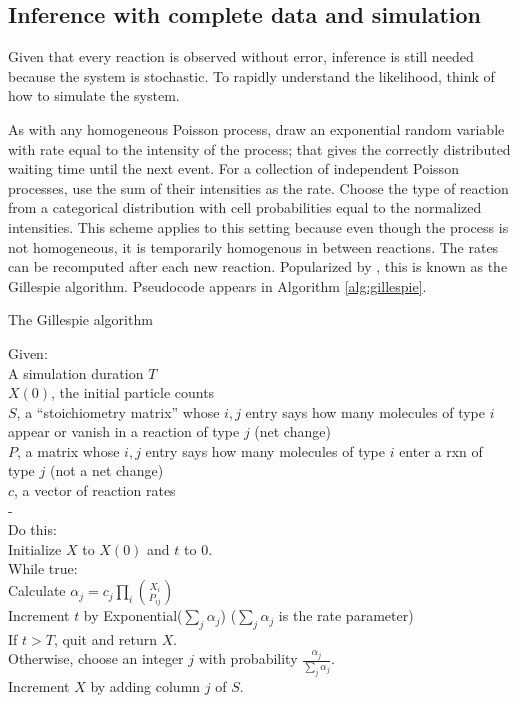 \documentclass{article}
\begin{document}
\subsection{Inference with complete data and simulation}
Given that every reaction is observed without error, inference is still needed because the system is stochastic. To rapidly understand the likelihood, think of how to simulate the system.

As with any homogeneous Poisson process, draw an exponential random variable with rate equal to the intensity of the process; that gives the correctly distributed waiting time until the next event. For a collection of independent Poisson processes, use the sum of their intensities as the rate. Choose the type of reaction from a categorical distribution with cell probabilities equal to the normalized intensities. This scheme applies to this setting because even though the process is not homogeneous, it is temporarily homogenous in between reactions. The rates can be recomputed after each new reaction. Popularized by  \cite{gillespie1977}, this is known as the Gillespie algorithm. Pseudocode appears in Algorithm \ref{alg:gillespie}.


\begin{algorithm}[h]
\caption{The Gillespie algorithm \label{alg:gillespie}}
Given:\\
\Indp
A simulation duration $T$\\
$X(0)$, the initial particle counts\\
$S$, a ``stoichiometry matrix'' whose $i,j$ entry says how many molecules of type $i$ appear or vanish in a reaction of type $j$ (net change)\\
$P$, a matrix whose $i,j$ entry says how many molecules of type $i$ enter a rxn of type $j$ (not a net change)\\
$c$, a vector of reaction rates\\
-\\
\Indm
Do this:\\
\Indp
Initialize $X$ to $X(0)$ and $t$ to 0.\\
While true:\\
\Indp
Calculate $\alpha_j = c_j\prod_i {X_i\choose P_{ij}}$\\
Increment $t$ by Exponential($\sum_j \alpha_j$) ($\sum_j \alpha_j$ is the rate parameter)\\
If $t > T$, quit and return $X$.\\
Otherwise, choose an integer $j$ with probability $\frac{\alpha_j}{\sum_j \alpha_j}$.\\
Increment $X$ by adding column $j$ of $S$.\\
\end{algorithm}
\end{document}
